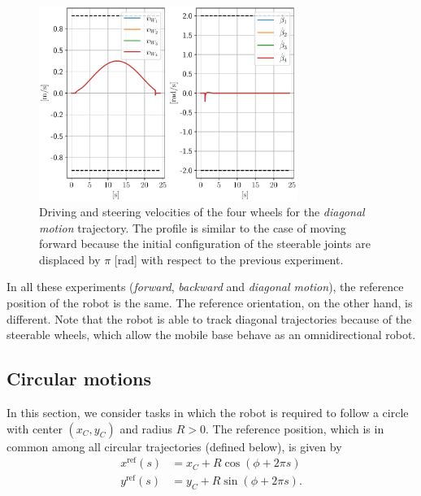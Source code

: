\begin{figure}
    \centering
    \includegraphics[width=0.75\textwidth]{figures/SWMR/simulations/diagonal/wheels_velocities.pdf}
    \caption{Driving and steering velocities of the four wheels for the
        \textit{diagonal motion} trajectory. The profile is similar to the 
        case of moving forward because the initial configuration of the steerable 
        joints are displaced by $\pi$ [rad] with respect to the previous 
        experiment.}
    \label{fig:simulations:diagonal:wheel-velocities}
\end{figure}

In all these experiments (\textit{forward}, \textit{backward} and
\textit{diagonal motion}), the reference position of the robot is the same.
The reference orientation, on the other hand, is different.
Note that the robot is able to track diagonal trajectories because of the
steerable wheels, which allow the mobile base behave as an omnidirectional robot.

\subsection{Circular motions}
In this section, we consider tasks in which the robot is required to follow
a circle with center $(x_C, y_C)$ and radius $R > 0$.
The reference position, which is in common among all circular trajectories
(defined below), is given by
\begin{subequations}
    \begin{align*}
        x^{\mathrm{ref}}(s) &= x_C + R \cos(\phi + 2 \pi s) \\
        y^{\mathrm{ref}}(s) &= y_C + R \sin(\phi + 2 \pi s).
    \end{align*} 
\end{subequations}

